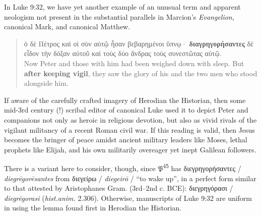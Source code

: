 \noindent{}In Luke 9:32, we have yet another example of an unusual term and %
apparent neologism not present in the substantial parallels in Marcion's \textit{Evangelion}, %
canonical Mark, and canonical Matthew. %

\vspace*{3mm} 
 \begin{quote}ὁ δὲ Πέτρος καὶ οἱ σὺν αὐτῷ ἦσαν βεβαρημένοι ὕπνῳ· %
 \textbf{διαγρηγορήσαντες} δὲ εἶδον τὴν δόξαν αὐτοῦ καὶ τοὺς δύο ἄνδρας τοὺς συνεστῶτας αὐτῷ. \\[1mm] %
 Now Peter and those with him had been weighed down with sleep. %
 But \textbf{after keeping vigil}, they saw the glory of his and the two men who stood alongside him. %
 \end{quote} %
\vspace*{2mm}

If aware of the carefully crafted imagery of Herodian the Historian, %
then some mid-3rd century (!) scribal editor of canonical Luke used it %
to depict Peter and companions not only as heroic in religious devotion, %
but also as vivid rivals of the vigilant militancy of a recent Roman civil war. %
If this reading is valid, then Jesus becomes the bringer of peace amidst ancient military leaders like Moses, %
lethal prophets like Elijah, and his own militarily overeager yet inept Galilean followers. %

There is a variant here to consider, though, %
since 𝔓\textsuperscript{45} has διεγρηγορήσαντες / \textit{diegrēgorēsantes} from διεγείρω / \textit{diegeirō} / “to wake up”, %
in a perfect form similar to that attested by Aristophanes Gram. (3rd--2nd c. BCE): %
διεγρηγόρασι / \textit{diegrēgorasi} (\textit{hist.anim.} 2.306). %
Otherwise, manuscripts of Luke 9:32 are uniform in using the lemma found first in Herodian the Historian. %

